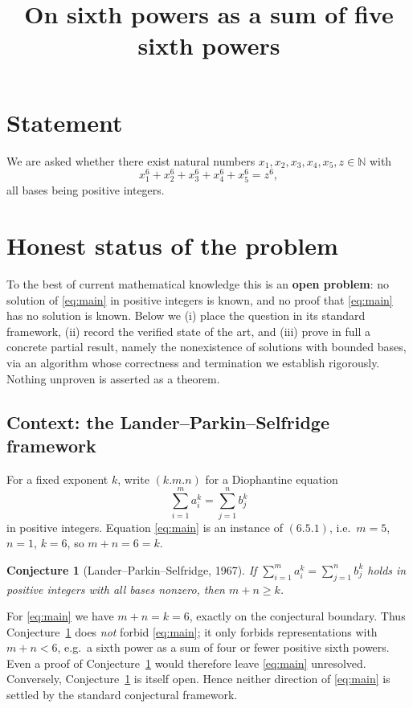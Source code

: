 \documentclass{amsart}
\newtheorem{conjecture}{Conjecture}
\begin{document}
\title{On sixth powers as a sum of five sixth powers}
\maketitle

\section*{Statement}
We are asked whether there exist natural numbers
$x_1,x_2,x_3,x_4,x_5,z\in\mathbb{N}$ with
\begin{equation}\label{eq:main}
x_1^6+x_2^6+x_3^6+x_4^6+x_5^6=z^6 ,
\end{equation}
all bases being positive integers.

\section*{Honest status of the problem}

To the best of current mathematical knowledge this is an
\textbf{open problem}: no solution of \eqref{eq:main} in positive
integers is known, and no proof that \eqref{eq:main} has no solution is
known. Below we (i) place the question in its standard framework,
(ii) record the verified state of the art, and (iii) prove in full a
concrete partial result, namely the nonexistence of solutions with
bounded bases, via an algorithm whose correctness and termination we
establish rigorously. Nothing unproven is asserted as a theorem.

\subsection*{Context: the Lander--Parkin--Selfridge framework}
For a fixed exponent $k$, write $(k.m.n)$ for a Diophantine equation
$$\sum_{i=1}^{m}a_i^{k}=\sum_{j=1}^{n}b_j^{k}$$
in positive integers. Equation \eqref{eq:main} is an instance of
$(6.5.1)$, i.e.\ $m=5$, $n=1$, $k=6$, so $m+n=6=k$.

\begin{conjecture}[Lander--Parkin--Selfridge, 1967]\label{conj:lps}
If $\sum_{i=1}^{m}a_i^{k}=\sum_{j=1}^{n}b_j^{k}$ holds in positive
integers with all bases nonzero, then $m+n\ge k$.
\end{conjecture}

For \eqref{eq:main} we have $m+n=k=6$, exactly on the conjectural
boundary. Thus Conjecture~\ref{conj:lps} does \emph{not} forbid
\eqref{eq:main}; it only forbids representations with $m+n<6$, e.g.\ a
sixth power as a sum of four or fewer positive sixth powers. Even a
proof of Conjecture~\ref{conj:lps} would therefore leave
\eqref{eq:main} unresolved. Conversely, Conjecture~\ref{conj:lps} is
itself open. Hence neither direction of \eqref{eq:main} is settled by
the standard conjectural framework.
\end{document}

